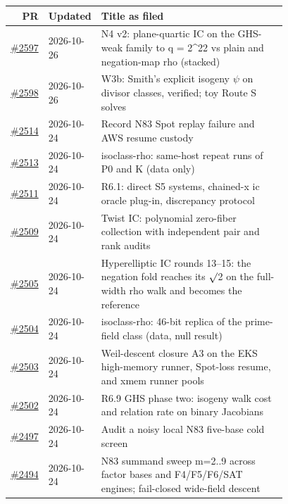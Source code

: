 {\footnotesize\setlength{\tabcolsep}{3pt}
\begin{longtable}{@{}r l >{\raggedright\arraybackslash}p{0.78\linewidth}@{}}
\toprule PR & Updated & Title as filed\\ \midrule \endhead
\bottomrule \endfoot
\href{https://github.com/aburan28/crypto/pull/2597}{\#2597} & 2026-10-26 & N4 v2: plane-quartic IC on the GHS-weak family to q = 2\textasciicircum{}22 vs plain and negation-map rho (stacked)\\
\href{https://github.com/aburan28/crypto/pull/2598}{\#2598} & 2026-10-26 & W3b: Smith's explicit isogeny $\psi$ on divisor classes, verified; toy Route S solves\\
\href{https://github.com/aburan28/crypto/pull/2514}{\#2514} & 2026-10-24 & Record N83 Spot replay failure and AWS resume custody\\
\href{https://github.com/aburan28/crypto/pull/2513}{\#2513} & 2026-10-24 & isoclass-rho: same-host repeat runs of P0 and K (data only)\\
\href{https://github.com/aburan28/crypto/pull/2511}{\#2511} & 2026-10-24 & R6.1: direct S5 systems, chained-x ic oracle plug-in, discrepancy protocol\\
\href{https://github.com/aburan28/crypto/pull/2509}{\#2509} & 2026-10-24 & Twist IC: polynomial zero-fiber collection with independent pair and rank audits\\
\href{https://github.com/aburan28/crypto/pull/2505}{\#2505} & 2026-10-24 & Hyperelliptic IC rounds 13--15: the negation fold reaches its $\surd$2 on the full-width rho walk and becomes the reference\\
\href{https://github.com/aburan28/crypto/pull/2504}{\#2504} & 2026-10-24 & isoclass-rho: 46-bit replica of the prime-field class (data, null result)\\
\href{https://github.com/aburan28/crypto/pull/2503}{\#2503} & 2026-10-24 & Weil-descent closure A3 on the EKS high-memory runner, Spot-loss resume, and xmem runner pools\\
\href{https://github.com/aburan28/crypto/pull/2502}{\#2502} & 2026-10-24 & R6.9 GHS phase two: isogeny walk cost and relation rate on binary Jacobians\\
\href{https://github.com/aburan28/crypto/pull/2497}{\#2497} & 2026-10-24 & Audit a noisy local N83 five-base cold screen\\
\href{https://github.com/aburan28/crypto/pull/2494}{\#2494} & 2026-10-24 & N83 summand sweep m=2..9 across factor bases and F4/\allowbreak{}F5/\allowbreak{}F6/\allowbreak{}SAT engines; fail-closed wide-field descent\\

\end{longtable}}
